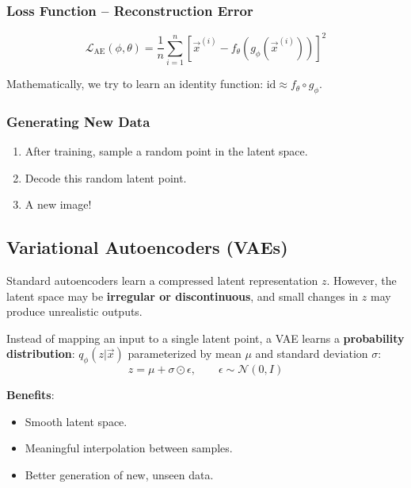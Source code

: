 \documentclass[11pt,a4paper]{article}
\newcommand{\vx}{\vec{x}}
\begin{document}
\subsubsection{Loss Function -- Reconstruction Error}

\[
\mathcal{L}_{\text{AE}}(\phi, \theta) = \frac{1}{n}\sum_{i=1}^n \left[\vx^{(i)} - f_\theta\!\left(g_\phi(\vx^{(i)})\right)\right]^2
\]

Mathematically, we try to learn an identity function: $\text{id} \approx f_\theta \circ g_\phi$.

\subsubsection{Generating New Data}

\begin{enumerate}[leftmargin=*]
    \item After training, sample a random point in the latent space.
    \item Decode this random latent point.
    \item A new image!
\end{enumerate}

\subsection{Variational Autoencoders (VAEs)}

\begin{warningbox}
Standard autoencoders learn a compressed latent representation $z$. However, the latent space may be \textbf{irregular or discontinuous}, and small changes in $z$ may produce unrealistic outputs.
\end{warningbox}

\begin{keybox}[title=VAE Key Idea]
Instead of mapping an input to a single latent point, a VAE learns a \textbf{probability distribution}: $q_\phi(z|\vx)$ parameterized by mean $\mu$ and standard deviation $\sigma$:
\[
z = \mu + \sigma \odot \epsilon, \qquad \epsilon \sim \mathcal{N}(0, I)
\]
\end{keybox}

\textbf{Benefits}:
\begin{itemize}[leftmargin=*]
    \item Smooth latent space.
    \item Meaningful interpolation between samples.
    \item Better generation of new, unseen data.
\end{itemize}
\end{document}
